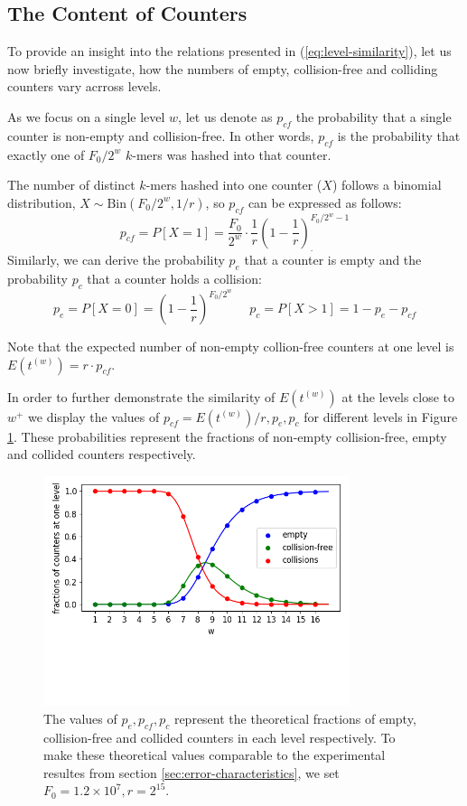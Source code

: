 \subsection{The Content of Counters}
To provide an insight into the relations presented in (\ref{eq:level-similarity}),
let us now briefly investigate, how the numbers of empty,
collision-free and colliding counters vary acrross levels.

As we focus on a single level $w$, let us denote as $p_{cf}$ the probability
that a single counter is non-empty and collision-free. In other words, $p_{cf}$ is the 
probability that exactly one of $F_0/2^w$ $k$-mers was hashed into that counter.

The number of distinct $k$-mers hashed into one counter ($X$)
follows a binomial distribution, $X \sim \mathrm{Bin}(F_0/2^w, 1/r)$, 
so $p_{cf}$ can be expressed as follows:
\begin{equation} \label{eq:pcf}
p_{cf} = P[X=1] = \frac{F_0}{2^w} \cdot \frac{1}{r} \left(1 - \frac{1}{r}\right)^{F_0/2^w - 1}_{.}
\end{equation}
Similarly, we can derive the probability $p_e$ that a counter is empty and the probability 
$p_c$ that a counter holds a collision:
$$p_e = P[X=0] = \left(1 - \frac{1}{r}\right)^{F_0/2^w} ~~~~~~ p_c = P[X>1] = 1 - p_e - p_{cf}$$

Note that the expected number of non-empty collion-free counters at one level is 
$E(t^{(w)}) = r \cdot p_{cf}$. 

In order to further demonstrate the similarity of $E(t^{(w)})$ at the levels close to $w^+$ we
display the values of $p_{cf} = E(t^{(w)}) / r, p_e, p_c$ for different levels in
Figure \ref{img:pe-pcf-pc}. These probabilities represent the fractions of 
non-empty collision-free, empty and collided counters respectively. 

\begin{figure}[h]
\centerline{\includegraphics[width=0.8\textwidth, trim={0cm, 3.5cm, 0cm, 0cm}, clip]{images/pcf.png}}
\caption[Plot of $p_e, p_{cf}, p_c$ across the levels]{The values of $p_e, p_{cf}, p_c$ 
represent the theoretical fractions of empty, collision-free and collided counters in
each level respectively. To make these theoretical values comparable to the experimental
resultes from section \ref{sec:error-characteristics}, we set $F_0 = 1.2 \times 10^7, r = 2^{15}$.} 
\label{img:pe-pcf-pc}
\end{figure}

